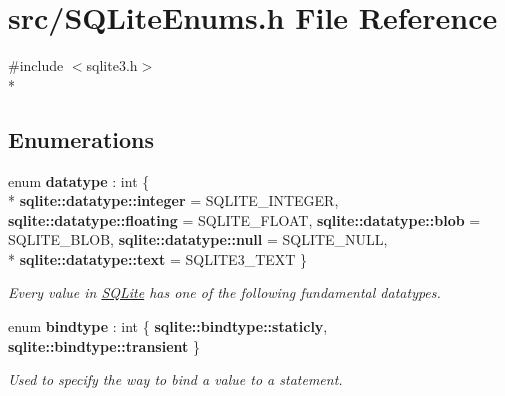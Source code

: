 \hypertarget{a00029}{\section{src/\-S\-Q\-Lite\-Enums.h File Reference}
\label{a00029}
}
{\ttfamily \#include $<$sqlite3.\-h$>$}\\*
\subsection*{Enumerations}
\begin{DoxyCompactItemize}
\item 
enum {\bfseries datatype} \-: int \{ \\*
{\bfseries sqlite\-::datatype\-::integer} = S\-Q\-L\-I\-T\-E\-\_\-\-I\-N\-T\-E\-G\-E\-R, 
{\bfseries sqlite\-::datatype\-::floating} = S\-Q\-L\-I\-T\-E\-\_\-\-F\-L\-O\-A\-T, 
{\bfseries sqlite\-::datatype\-::blob} = S\-Q\-L\-I\-T\-E\-\_\-\-B\-L\-O\-B, 
{\bfseries sqlite\-::datatype\-::null} = S\-Q\-L\-I\-T\-E\-\_\-\-N\-U\-L\-L, 
\\*
{\bfseries sqlite\-::datatype\-::text} = S\-Q\-L\-I\-T\-E3\-\_\-\-T\-E\-X\-T
 \}
\begin{DoxyCompactList}\small\item\em Every value in \hyperlink{a00038}{S\-Q\-Lite} has one of the following fundamental datatypes. \end{DoxyCompactList}\item 
enum {\bfseries bindtype} \-: int \{ {\bfseries sqlite\-::bindtype\-::staticly}, 
{\bfseries sqlite\-::bindtype\-::transient}
 \}
\begin{DoxyCompactList}\small\item\em Used to specify the way to bind a value to a statement. \end{DoxyCompactList}\end{DoxyCompactItemize}
